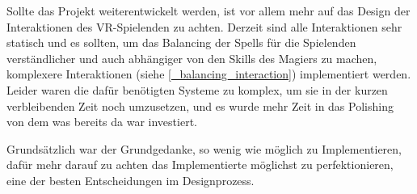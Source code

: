 Sollte das Projekt weiterentwickelt werden, ist vor allem mehr auf das Design der Interaktionen des VR-Spielenden zu achten. Derzeit sind alle Interaktionen sehr statisch und es sollten, um das Balancing der Spells für die Spielenden verständlicher und auch abhängiger von den Skills des Magiers zu machen, komplexere Interaktionen (siehe \ref{_balancing_interaction}) implementiert werden. Leider waren die dafür benötigten Systeme zu komplex, um sie in der kurzen verbleibenden Zeit noch umzusetzen, und es wurde mehr Zeit in das Polishing von dem was bereits da war investiert.

Grundsätzlich war der Grundgedanke, so wenig wie möglich zu Implementieren, dafür mehr darauf zu achten das Implementierte möglichst zu perfektionieren, eine der besten Entscheidungen im Designprozess.